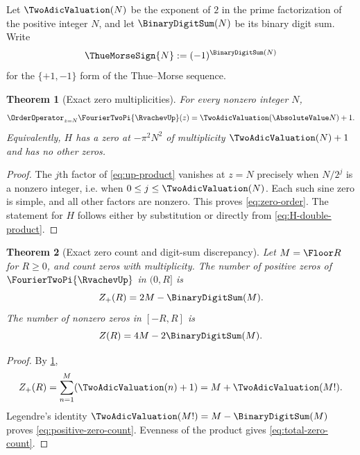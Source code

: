 \documentclass[11pt]{article}
\numberwithin{equation}{section}
\newtheorem{theorem}{Theorem}[section]
\theoremstyle{definition}
\theoremstyle{remark}
\begin{document}
Let $\TwoAdicValuation(N)$ be the exponent of $2$ in the prime factorization of the positive integer $N$, and let $\BinaryDigitSum(N)$ be its binary digit sum.  Write
\[
 \ThueMorseSign{N}:=(-1)^{\BinaryDigitSum(N)}
\]
for the $\{+1,-1\}$ form of the Thue--Morse sequence.

\begin{theorem}[Exact zero multiplicities]\label{thm:zero-multiplicity}
For every nonzero integer $N$,
\begin{equation}\label{eq:zero-order}
 \OrderOperator_{z=N}\FourierTwoPi{\RvachevUp}(z)=\TwoAdicValuation(\AbsoluteValue N)+1.
\end{equation}
Equivalently, $H$ has a zero at $-\pi^2N^2$ of multiplicity $\TwoAdicValuation(N)+1$ and has no other zeros.
\end{theorem}
\begin{proof}
The $j$th factor of \eqref{eq:up-product} vanishes at $z=N$ precisely when $N/2^j$ is a nonzero integer, i.e. when $0\le j\le\TwoAdicValuation(N)$.  Each such sine zero is simple, and all other factors are nonzero.  This proves \eqref{eq:zero-order}.  The statement for $H$ follows either by substitution or directly from \eqref{eq:H-double-product}.
\end{proof}

\begin{theorem}[Exact zero count and digit-sum discrepancy]\label{thm:zero-count}
Let $M=\Floor R$ for $R\ge0$, and count zeros with multiplicity.  The number of positive zeros of $\FourierTwoPi{\RvachevUp}$ in $(0,R]$ is
\begin{equation}\label{eq:positive-zero-count}
 Z_+(R)=2M-\BinaryDigitSum(M).
\end{equation}
The number of nonzero zeros in $[-R,R]$ is
\begin{equation}\label{eq:total-zero-count}
 Z(R)=4M-2\BinaryDigitSum(M).
\end{equation}
\end{theorem}
\begin{proof}
By \cref{thm:zero-multiplicity},
\[
 Z_+(R)=\sum_{n=1}^{M}(\TwoAdicValuation(n)+1)=M+\TwoAdicValuation(M!).
\]
Legendre's identity $\TwoAdicValuation(M!)=M-\BinaryDigitSum(M)$ proves \eqref{eq:positive-zero-count}.  Evenness of the product gives \eqref{eq:total-zero-count}.
\end{proof}
\end{document}
